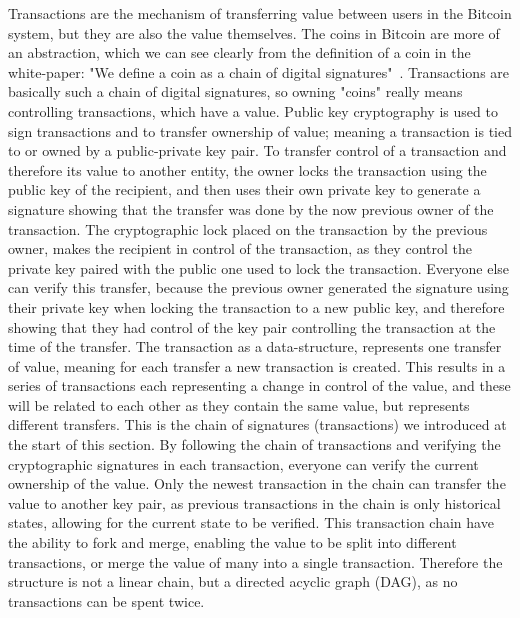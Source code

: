 Transactions are the mechanism of transferring value between users in the Bitcoin system, but they are also the value themselves.
The coins in Bitcoin are more of an abstraction, which we can see clearly from the definition of a coin in the white-paper: "We define a coin as a chain of digital signatures"~\cite{nakamoto2008bitcoin}.
Transactions are basically such a chain of digital signatures, so owning "coins" really means controlling transactions, which have a value.
Public key cryptography is used to sign transactions and to transfer ownership of value; meaning a transaction is tied to or owned by a public-private key pair.
To transfer control of a transaction and therefore its value to another entity, the owner locks the transaction using the public key of the recipient, and then uses their own private key to generate a signature showing that the transfer was done by the now previous owner of the transaction. The cryptographic lock placed on the transaction by the previous owner, makes the recipient in control of the transaction, as they control the private key paired with the public one used to lock the transaction. Everyone else  can verify this transfer, because the previous owner generated the signature using their private key when locking the transaction to a new public key, and therefore showing that they had control of the key pair controlling the transaction at the time of the transfer. The transaction as a data-structure, represents one transfer of value, meaning for each transfer a new transaction is created. This results in a series of transactions each representing a change in control of the value, and these will be related to each other as they contain the same value, but represents different transfers. This is the chain of signatures (transactions) we introduced at the start of this section. By following the chain of transactions and verifying the cryptographic signatures in each transaction, everyone can verify the current ownership of the value. Only the newest transaction in the chain can transfer the value to another key pair, as previous transactions in the chain is only historical states, allowing for the current state to be verified. This transaction chain have the ability to fork and merge, enabling the value to be split into different transactions, or merge the value of many into a single transaction. Therefore the structure is not a linear chain, but a directed acyclic graph (DAG), as no transactions can be spent twice.
